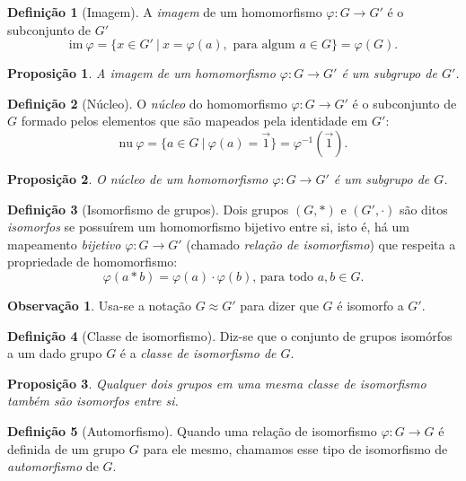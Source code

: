 \documentclass[a4paper,12pt]{report}
\theoremstyle{plain}
\newtheorem{proposicao}{Proposição}[section]
\theoremstyle{definition}
\newtheorem{definicao}{Definição}[section]
\newtheorem{observacao}{Observação}[section]
\begin{document}
	\begin{definicao}[Imagem]
		A \emph{imagem} de um homomorfismo
		\(\varphi: G\longrightarrow G'\) é o subconjunto de \(G'\)	\[\text{im}\ \varphi = \{x\in G' \ |\ x = \varphi(a), \text{ para algum } a\in G\} = \varphi(G).\]
	\end{definicao}
	
	\begin{proposicao}
		A imagem de um homomorfismo $\varphi: G \longrightarrow G'$ é um subgrupo de $G'$.
	\end{proposicao}
	
	\begin{definicao}[Núcleo]
		O \emph{núcleo} do homomorfismo $\varphi: G \longrightarrow G'$ é o subconjunto de
		\(G\) formado pelos elementos que são mapeados pela identidade em
		\(G'\):	\[\text{nu} \ \varphi = \{a \in G \ | \ \varphi(a) = \vec{1}\} = \varphi^{-1}(\vec{1}).\]
	\end{definicao}
	
	\begin{proposicao}
		O núcleo de um homomorfismo $\varphi: G \longrightarrow G'$ é um subgrupo de $G$.
	\end{proposicao}
	
	\begin{definicao}[Isomorfismo de grupos]
		Dois grupos \((G,*)\) e \((G',\cdot)\) são ditos \emph{isomorfos} se possuírem um homomorfismo bijetivo entre si, isto é, há um mapeamento \emph{bijetivo} $\varphi: G \longrightarrow G'$ (chamado \emph{relação de isomorfismo}) que respeita a propriedade de homomorfismo:
		\[\varphi(a*b) = \varphi(a)\cdot\varphi(b) \text{, para todo } a,b \in G.\] 
	\end{definicao}
	
	\begin{observacao}
		Usa-se a notação $G \approx G'$ para dizer que $G$ é isomorfo a $G'$.  
	\end{observacao}
	
	\begin{definicao}[Classe de isomorfismo]
		Diz-se que o conjunto de grupos isomórfos a um dado grupo \(G\) é a \emph{classe de isomorfismo de \(G\)}.	
	\end{definicao}
	
	\begin{proposicao}
		Qualquer dois grupos em uma mesma classe de isomorfismo também são isomorfos entre si.
	\end{proposicao}
	
	\begin{definicao}[Automorfismo]
		Quando uma relação de isomorfismo \(\varphi: G\longrightarrow G\) é definida de um grupo \(G\) para ele mesmo,	chamamos esse tipo de isomorfismo de \emph{automorfismo} de \(G\).
	\end{definicao}
	
\end{document}
